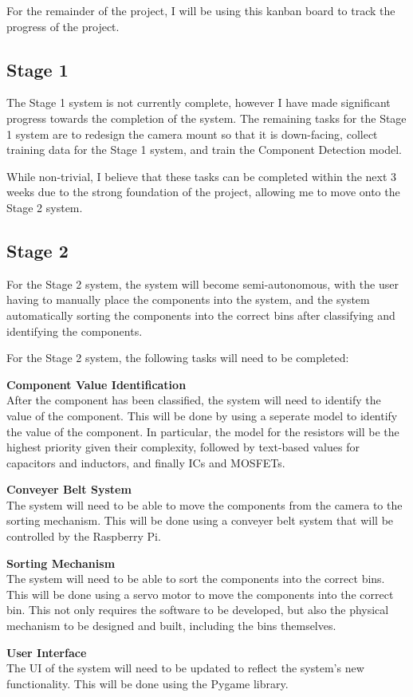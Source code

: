 For the remainder of the project, I will be using this kanban board to track the progress of the project. 
 \subsection{Stage 1}
The Stage 1 system is not currently complete, however I have made significant progress towards the completion of the system. The remaining
tasks for the Stage 1 system are to redesign the camera mount so that it is down-facing, collect training data for the Stage 1 system, and
train the Component Detection model. 

While non-trivial, I believe that these tasks can be completed within the next 3 weeks due to the strong foundation of the project, allowing me to move onto the Stage 2 system.

\subsection{Stage 2}
For the Stage 2 system, the system will become semi-autonomous, with the user having to manually place the components into the system, and the system
automatically sorting the components into the correct bins after classifying and identifying the components. 

For the Stage 2 system, the following tasks will need to be completed:
\begin{mylist}
    \item \textbf{Component Value Identification} \\
    After the component has been classified, the system will need to identify the value of the component. This will be done by using
    a seperate model to identify the value of the component. In particular, the model for the resistors will be the highest
    priority given their complexity, followed by text-based values for capacitors and inductors, and finally ICs and MOSFETs.
    \item \textbf{Conveyer Belt System} \\
    The system will need to be able to move the components from the camera to the sorting mechanism. This will be done using a conveyer belt system
    that will be controlled by the Raspberry Pi.
    \item \textbf{Sorting Mechanism} \\
    The system will need to be able to sort the components into the correct bins. This will be done using a servo motor to move the components into the correct bin.
    This not only requires the software to be developed, but also the physical mechanism to be designed and built, including the bins themselves.
    \item \textbf{User Interface} \\
    The UI of the system will need to be updated to reflect the system's new functionality. This will be done using the Pygame library\cite{pygamedoc}.
\end{mylist}

